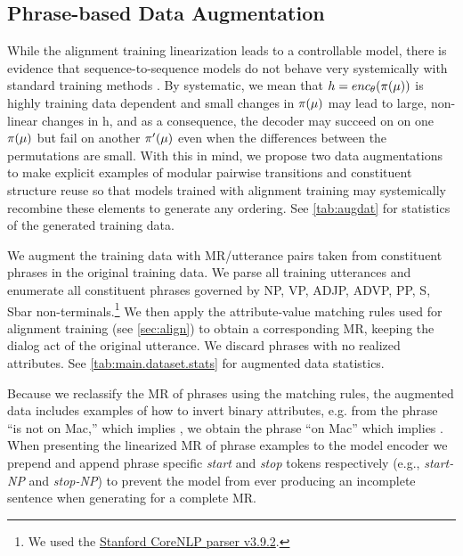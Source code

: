\subsection{Phrase-based Data Augmentation}



While the alignment training linearization leads to a controllable model,
there is evidence that sequence-to-sequence models do not behave very
systemically with standard training methods 
\cite{lake2018generalization,loula2018rearranging}. By systematic, we mean that
$h = enc_\theta(\pi(\mu))$ is highly training data dependent and 
 small changes in $\pi(\mu)$ may lead to large, non-linear
changes in h, and as a consequence, the decoder may succeed on
on one $\pi(\mu)$ but fail on another $\pi^\prime(\mu)$ even when the 
differences between the permutations are small. With this in mind, we propose
two data augmentations to make explicit examples of  modular pairwise 
transitions and constituent structure reuse so that models trained with alignment training
may systemically recombine these elements to generate any ordering.
See \autoref{tab:augdat} for statistics of the generated training data.


We augment the training data with MR/utterance pairs taken from constituent
phrases in the original training data. 
We parse all training utterances and enumerate all constituent phrases
governed by 
NP, VP, ADJP, ADVP, PP, S, Sbar
non-terminals.\footnote{We used the \href{https://stanfordnlp.github.io/CoreNLP/}{Stanford CoreNLP parser v3.9.2}.} We then apply the attribute-value 
matching rules
used for alignment training (see \autoref{sec:align})
to obtain a corresponding MR, keeping the dialog act 
of the original utterance. We discard
phrases with no realized attributes.
See \autoref{tab:main.dataset.stats} for augmented data statistics.

Because 
we reclassify the MR of phrases using the matching rules, 
the augmented  data includes examples of
how to invert binary attributes, e.g. from the phrase
``is not on Mac,'' which implies ,
we obtain the phrase ``on Mac'' which implies 
.
When presenting the linearized MR of phrase examples to the model encoder
we prepend and append phrase specific \textit{start} and \textit{stop} tokens respectively
(e.g., \textit{start-NP} and \textit{stop-NP}) to prevent the model
from ever producing an incomplete sentence when generating for a complete MR.



